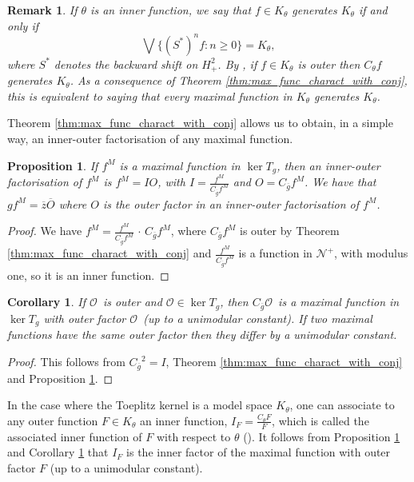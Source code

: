 \documentclass[12pt]{elsarticle}
\numberwithin{equation}{section}
\theoremstyle{plain}
\newtheorem{prop}[thm]{Proposition}
\newtheorem{cor}[thm]{Corollary}
\newtheorem{rem}[thm]{Remark}
\newcommand{\Hp}{\ensuremath{H^2_+}}
\newcommand{\OO}{\ensuremath{\mathcal{O}}}
\newcommand{\NN}{\ensuremath{\mathcal{N}^+}}
\newcommand{\Cg}{\ensuremath{C_{\ol g}}}
\newcommand{\ol}[1]{\ensuremath{\overline{#1}}}
\begin{document}
\begin{rem}
If $\theta$ is an inner function, we say that $f\in K_\theta$ generates $K_\theta$ if and only if 
\[
\bigvee \{ \left( S^* \right)^n f : n \geq 0 \} = K_\theta,
\]
where $S^*$ denotes the backward shift on \Hp.
By \cite[Corollary 8.25]{GarMashRoss16}, if $f\in K_\theta$ is outer then $C_\theta f$ generates $K_\theta$.
As a consequence of Theorem \ref{thm:max_func_charact_with_conj}, this is equivalent to saying that every maximal function in  $K_\theta$ generates $K_\theta$.
\end{rem}


Theorem \ref{thm:max_func_charact_with_conj} allows us to obtain, in a simple way, an inner-outer factorisation of any maximal function.

\begin{prop}
\label{prop:IO_fact_max_func_with_conj}
If $f^M$ is a maximal function in $\ker T_g$, then an inner-outer factorisation of $f^M$ is $f^M = IO$, with $I = \frac{f^M}{\Cg f^M}$ and $O = \Cg f^M$.
We have that $g f^M = \ol z \ol O$ where $O$ is the outer factor in an inner-outer factorisation of $f^M$.
\end{prop}


\begin{proof}
We have $f^M = \frac{f^M}{\Cg f^M} \, \cdot \, \Cg f^M$, where $\Cg f^M$ is outer by Theorem \ref{thm:max_func_charact_with_conj} and $\frac{f^M}{\Cg f^M}$ is a function in \NN, with modulus one, so it is an inner function.
\end{proof}



\begin{cor}
\label{cor:outer+conj=max_func}
If \OO\ is outer and $\OO \in \ker T_g$, then \Cg\OO\ is a maximal function in $\ker T_g$ with outer factor \OO\ (up to a unimodular constant).
If two maximal functions have the same outer factor then they differ by a unimodular constant.
\end{cor}

\begin{proof}
This follows from $\Cg^2 = I$, Theorem \ref{thm:max_func_charact_with_conj} and Proposition \ref{prop:IO_fact_max_func_with_conj}.
\end{proof}


In the case where the Toeplitz kernel is a model space $K_\theta$, one can associate to any outer function $F\in K_\theta$ an inner function, $I_F = \frac{C_\theta F}{F}$, which is called the associated inner function of $F$ with respect to $\theta$ (\cite[Definition 8.18]{GarMashRoss16}).
It follows from Proposition \ref{prop:IO_fact_max_func_with_conj} and Corollary \ref{cor:outer+conj=max_func} that $I_F$ is the inner factor of the maximal function with outer factor $F$ (up to a unimodular constant).
\end{document}
